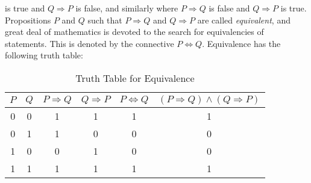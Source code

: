         is true and $Q\Rightarrow{P}$ is false, and similarly where
        $P\Rightarrow{Q}$ is false and $Q\Rightarrow{P}$ is true. Propositions
        $P$ and $Q$ such that $P\Rightarrow{Q}$ and $Q\Rightarrow{P}$ are called
        \textit{equivalent}, and great deal of mathematics is devoted to the
        search for equivalencies of statements. This is denoted by the
        connective $P\Leftrightarrow{Q}$. Equivalence has the following truth
        table:
        \begin{table}[H]
            \centering
            \captionsetup{type=table}
            \begin{tabular}{cccccc}
                $P$&$Q$&$P\Rightarrow{Q}$&$Q\Rightarrow{P}$
                   &$P\Leftrightarrow{Q}$
                   &$(P\Rightarrow{Q})\land(Q\Rightarrow{P})$\\
                \hline
                0&0&1&1&1&1\\
                0&1&1&0&0&0\\
                1&0&0&1&0&0\\
                1&1&1&1&1&1
            \end{tabular}
            \caption{Truth Table for Equivalence}
            \label{tab:Truth_Table_for_Equivalence}
        \end{table}
